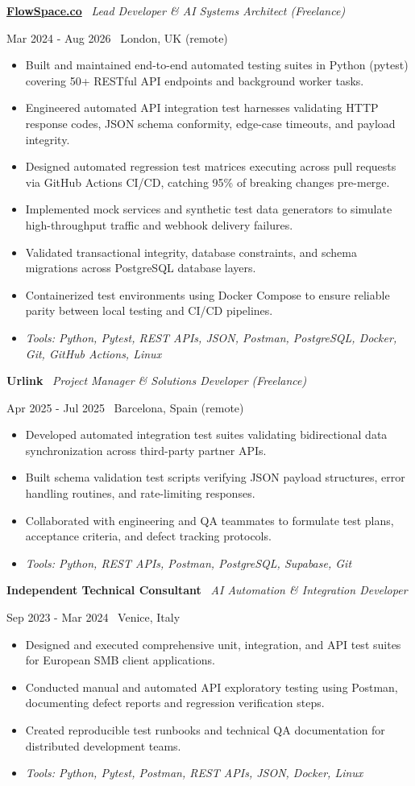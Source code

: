 \documentclass[a4paper,10pt]{article}
\newcommand{\role}[4]{%
  \vspace{2pt}\noindent
  \begin{minipage}[t]{0.70\textwidth}\raggedright\textbf{#1} \textbullet\ \textit{#3}\end{minipage}%
  \hfill
  \begin{minipage}[t]{0.28\textwidth}\raggedleft\footnotesize\color{gray}#2 \textbullet\ #4\end{minipage}%
  \vspace{1pt}%
}
\begin{document}
\role{\href{https://flowspace.co}{FlowSpace.co}}{Mar 2024 - Aug 2026}{Lead Developer \& AI Systems Architect (Freelance)}{London, UK (remote)}
\begin{itemize}
  \item Built and maintained end-to-end automated testing suites in Python (pytest) covering 50+ RESTful API endpoints and background worker tasks.
  \item Engineered automated API integration test harnesses validating HTTP response codes, JSON schema conformity, edge-case timeouts, and payload integrity.
  \item Designed automated regression test matrices executing across pull requests via GitHub Actions CI/CD, catching 95\% of breaking changes pre-merge.
  \item Implemented mock services and synthetic test data generators to simulate high-throughput traffic and webhook delivery failures.
  \item Validated transactional integrity, database constraints, and schema migrations across PostgreSQL database layers.
  \item Containerized test environments using Docker Compose to ensure reliable parity between local testing and CI/CD pipelines.
  \item \textit{Tools: Python, Pytest, REST APIs, JSON, Postman, PostgreSQL, Docker, Git, GitHub Actions, Linux}
\end{itemize}

\role{Urlink}{Apr 2025 - Jul 2025}{Project Manager \& Solutions Developer (Freelance)}{Barcelona, Spain (remote)}
\begin{itemize}
  \item Developed automated integration test suites validating bidirectional data synchronization across third-party partner APIs.
  \item Built schema validation test scripts verifying JSON payload structures, error handling routines, and rate-limiting responses.
  \item Collaborated with engineering and QA teammates to formulate test plans, acceptance criteria, and defect tracking protocols.
  \item \textit{Tools: Python, REST APIs, Postman, PostgreSQL, Supabase, Git}
\end{itemize}

\role{Independent Technical Consultant}{Sep 2023 - Mar 2024}{AI Automation \& Integration Developer}{Venice, Italy}
\begin{itemize}
  \item Designed and executed comprehensive unit, integration, and API test suites for European SMB client applications.
  \item Conducted manual and automated API exploratory testing using Postman, documenting defect reports and regression verification steps.
  \item Created reproducible test runbooks and technical QA documentation for distributed development teams.
  \item \textit{Tools: Python, Pytest, Postman, REST APIs, JSON, Docker, Linux}
\end{itemize}
\end{document}
